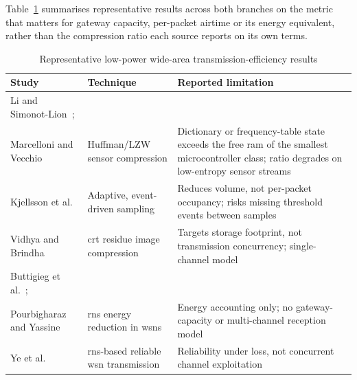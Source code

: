 \documentclass[12pt,a4paper,oneside]{book}
\begin{document}
Table~\ref{tab:lit-lpwan-comparison} summarises representative results
across both branches on the metric that matters for gateway capacity,
per-packet airtime or its energy equivalent, rather than the compression
ratio each source reports on its own terms.

\begin{table}[htbp]
\centering
\caption{Representative low-power wide-area transmission-efficiency results}
\label{tab:lit-lpwan-comparison}
\footnotesize
\begin{tabularx}{\textwidth}{@{}p{}p{}X@{}}
\toprule
\textbf{Study} & \textbf{Technique} & \textbf{Reported limitation} \\
\midrule
Li and Simonot-Lion~\cite{li2018lossless};\\ Marcelloni and Vecchio~\cite{marcelloni2009energy}
  & Huffman/LZW sensor compression
  & Dictionary or frequency-table state exceeds the free \gls{ram} of the
    smallest microcontroller class; ratio degrades on low-entropy sensor
    streams \\
\midrule
Kjellsson et al.~\cite{kjellsson2008adaptive}
  & Adaptive, event-driven sampling
  & Reduces volume, not per-packet occupancy; risks missing threshold
    events between samples \\
\midrule
Vidhya and Brindha~\cite{vidhya2021crt}
  & \gls{crt} residue image compression
  & Targets storage footprint, not transmission concurrency; single-channel
    model \\
\midrule
Buttigieg et al.~\cite{khan2023fuzzycrt};\\ Pourbigharaz and Yassine~\cite{rahman2022rnsenergy}
  & \gls{rns} energy reduction in \glspl{wsn}
  & Energy accounting only; no gateway-capacity or multi-channel reception
    model \\
\midrule
Ye et al.~\cite{djeddi2025parallelCRT}
  & \gls{rns}-based reliable \gls{wsn} transmission
  & Reliability under loss, not concurrent channel exploitation \\
\bottomrule
\end{tabularx}
\end{table}

\label{subsec:lit_crt}
\end{document}
